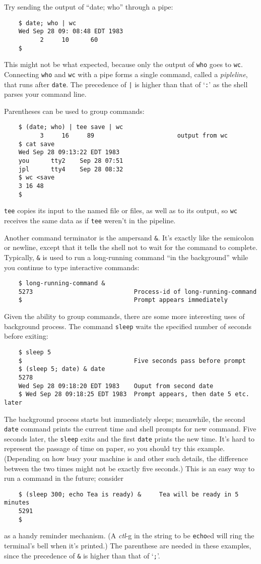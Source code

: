 	Try sending the output of ``date; who'' through a pipe:
\begin{verbatim}
    $ date; who | wc
    Wed Sep 28 09: 08:48 EDT 1983
          2     10      60
    $
\end{verbatim}
This might not be what expected, because only the output of \verb=who= goes to
\verb=wc=. Connecting \verb=who= and \verb=wc= with a pipe forms a single command, called a
\textit{pipleline}, that runs after \verb=date=. The precedence of \verb=|= is higher than that of `\verb=:='
as the shell parses your command line.

	Parentheses can be used to group commands:
\begin{verbatim}
    $ (date; who) | tee save | wc
          3     16     89                       output from wc
    $ cat save
    Wed Sep 28 09:13:22 EDT 1983
    you      tty2    Sep 28 07:51
    jpl      tty4    Sep 28 08:32
    $ wc <save
    3 16 48
    $	
\end{verbatim}
\verb=tee= copies its input to the named file or files, as well as to its output, so \verb=wc=
receives the same data as if \verb=tee= weren't in the pipeline.

    Another command terminator is the ampersand \verb=&=. It's exactly like the
semicolon or newline, except that it tells the shell not to wait for the command
to complete. Typically, \verb=&= is used to run a long-running command ``in the
background'' while you continue to type interactive commands:
\begin{verbatim}
    $ long-running-command &
    5273                            Process-id of long-running-command
    $                               Prompt appears immediately    
\end{verbatim}
Given the ability to group commands, there are some more interesting uses of
background process. The command \verb=sleep= waits the specified number of
seconds before exiting:
\begin{verbatim}
    $ sleep 5
    $                               Five seconds pass before prompt
    $ (sleep 5; date) & date
    5278
    Wed Sep 28 09:18:20 EDT 1983    Ouput from second date
    $ Wed Sep 28 09:18:25 EDT 1983  Prompt appears, then date 5 etc. later
\end{verbatim}
The background process starts but immediately sleeps; meanwhile, the second
\verb=date= command prints the current time and shell prompts for new command.
Five seconds later, the \verb=sleep= exits and the first \verb=date= prints the new
time. It's hard to represent the passage of time on paper, so you should
try this example. (Depending on how busy your machine is and other such details,
the difference between the two times might not be exactly five seconds.) This
is an easy way to run a command in the future; consider
\begin{verbatim}
    $ (sleep 300; echo Tea is ready) &     Tea will be ready in 5 minutes
    5291
    $
\end{verbatim}
as a handy reminder mechanism. (A \textit{ctl}-g in the string to be \verb=echo=ed will ring
the terminal's bell when it's printed.) The parenthese are needed in these
examples, since the precedence of \verb=&= is higher than that of `\verb=;='.

